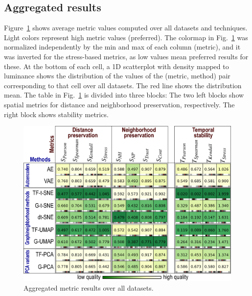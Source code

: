 \subsection{Aggregated results}
\label{sec:aggregate}
%

Figure~\ref{fig:aggregated} shows average metric values computed over all datasets and techniques.
Light colors represent high metric values (preferred). The colormap in Fig.~\ref{fig:aggregated} was normalized independently by the min and max of each column (metric), and it was inverted for the stress-based metrics, as low values mean preferred results for these. At the bottom of each cell, a 1D scatterplot with density mapped to luminance shows the distribution of the values of the (metric, method) pair corresponding to that cell over all datasets. The red line shows the distribution mean. The table in Fig.~\ref{fig:aggregated} is divided into three blocks: The two left blocks show spatial metrics for distance and neighborhood preservation, respectively. The right block shows stability metrics.

\begin{figure}[tb]\centering
  \includegraphics[width=.95\linewidth]{figures/projection-evaluation/aggregate_matrix.eps}
  \caption{Aggregated metric results over all datasets.}
  \label{fig:aggregated}
\end{figure}

